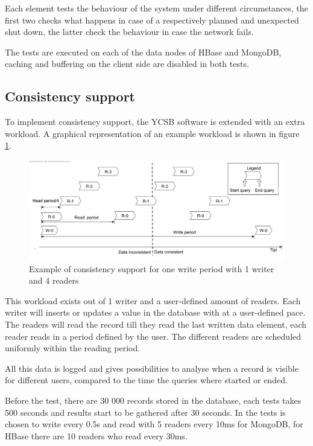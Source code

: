 \documentclass[10pt,conference,letterpaper]{IEEEtran}
\begin{document}
Each element tests the behaviour of the system under different circumstances, the first two checks what happens in case of a respectively planned and unexpected shut down, the latter check the behaviour in case the network fails. 

The tests are executed on each of the data nodes of HBase and MongoDB, caching and buffering on the client side are disabled in both tests. 

\subsection{Consistency support}
To implement consistency support, the YCSB software is extended with an extra workload. A graphical representation of an example workload is shown in figure \ref{fig:consistence-method}. 
\begin{figure}[ht]
\centering
\includegraphics[width=\linewidth]{../img/Consistency-test-period}
\caption{Example of consistency support for one write period with 1 writer and 4 readers}
\label{fig:consistence-method}
\end{figure}
This workload exists out of 1 writer and a user-defined amount of readers.  Each writer will inserts or updates a value in the database with at a user-defined pace. The readers will read the record till they read the last written data element, each reader reads in a period defined by the user. The different readers are scheduled uniformly within the reading period. 

All this data is logged and gives possibilities to analyse when a record is visible for different users, compared to the time the queries where started or ended. 

Before the test, there are 30 000 records stored in the database, each tests takes 500 seconds and results start to be gathered after 30 seconds. In the tests is chosen to write every 0.5s and read with 5 readers every 10ms for MongoDB, for HBase there are 10 readers who read every 30ms.  
 
\end{document}
